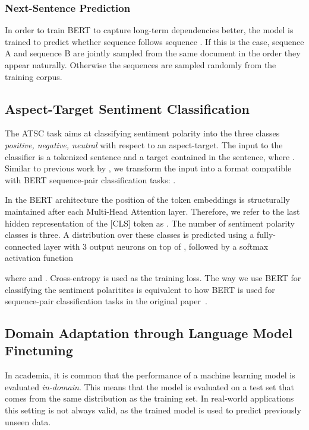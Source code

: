 \documentclass[11pt,a4paper]{article}
\newcommand{\rood}[1]{}
\begin{document}
\subsubsection*{Next-Sentence Prediction}
In order to train BERT to capture long-term dependencies better, the
model is trained to predict whether sequence  follows sequence . If
this is the case, sequence A and sequence B are jointly sampled from
the same document in the order they appear naturally. Otherwise
the sequences are sampled randomly from the training corpus.

\subsection{Aspect-Target Sentiment Classification}
\rood{Outcome: Readers should understand how we use a linear pooling layer on top of bert and that has been used by 2 other papers in a similar manner.
}

The ATSC task aims at classifying sentiment polarity into the three classes \textit{positive, negative, neutral} with respect to an aspect-target.
The input to the classifier is a tokenized sentence  and a target  contained in the sentence, where .
Similar to previous work by \citet{Sun2019}, we transform the input into a format compatible with BERT sequence-pair classification tasks:
.

In the BERT architecture the position of the token embeddings is structurally maintained after each Multi-Head Attention layer. Therefore, we refer to the last hidden representation of the [CLS] token as .
The number of sentiment polarity classes is three. A distribution  over these classes is predicted using a fully-connected layer with 3 output neurons on top of , followed by a softmax activation function

where  and .
Cross-entropy is used as the training loss. The way we use BERT for classifying the sentiment polaritites is equivalent to how BERT is used for sequence-pair classification tasks in the original paper~\cite{Devlin2019}.

\subsection{Domain Adaptation through Language Model Finetuning}
\rood{Outcome: Reader should understand in detail that we train on many variants
  in order to check performance}
In academia, it is common that the performance of a machine learning model is evaluated \textit{in-domain}. This means that the model is evaluated on a test set that comes from the same distribution as the training set. In real-world applications this setting is not always valid, as the trained model is used to predict previously unseen data.
\end{document}
